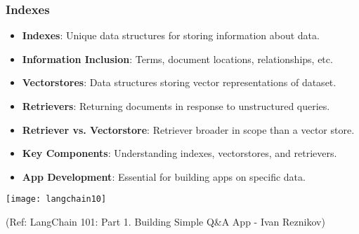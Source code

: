 \begin{frame}[fragile]\frametitle{Indexes}


      \begin{itemize}
        \item \textbf{Indexes}: Unique data structures for storing information about data.
        \item \textbf{Information Inclusion}: Terms, document locations, relationships, etc.
        \item \textbf{Vectorstores}: Data structures storing vector representations of dataset.
        \item \textbf{Retrievers}: Returning documents in response to unstructured queries.
        \item \textbf{Retriever vs. Vectorstore}: Retriever broader in scope than a vector store.
        \item \textbf{Key Components}: Understanding indexes, vectorstores, and retrievers.
        \item \textbf{App Development}: Essential for building apps on specific data.
      \end{itemize}

			\begin{center}
			\texttt{[image: langchain10]}
			\end{center}	  


			{\tiny (Ref: LangChain 101: Part 1. Building Simple Q\&A App - Ivan Reznikov)}


\end{frame}

